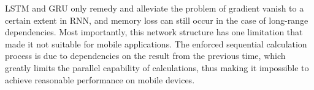 LSTM and GRU only remedy and alleviate the problem of gradient vanish to a certain extent in RNN, and memory loss can still occur in the case of long-range dependencies.
Most importantly, this network structure has one limitation that made it not suitable for mobile applications.
The enforced sequential calculation process is due to dependencies on the result from the previous time, which greatly limits the parallel capability of calculations, thus making it impossible to achieve reasonable performance on mobile devices.
